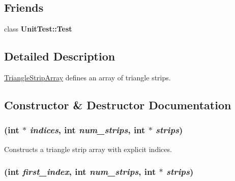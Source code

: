 \subsection*{Friends}
\begin{CompactItemize}
\item 
\hypertarget{classm3g_1_1TriangleStripArray_1f61169bea98d63b51332345ccaea9d5}{
class \textbf{UnitTest::Test}}
\label{classm3g_1_1TriangleStripArray_1f61169bea98d63b51332345ccaea9d5}

\end{CompactItemize}


\subsection{Detailed Description}
\hyperlink{classm3g_1_1TriangleStripArray}{TriangleStripArray} defines an array of triangle strips. 

\subsection{Constructor \& Destructor Documentation}
\hypertarget{classm3g_1_1TriangleStripArray_57d4e874819367084aeadb11593c4436}{
\subsubsection[{TriangleStripArray}]{ (int $\ast$ {\em indices}, \/  int {\em num\_\-strips}, \/  int $\ast$ {\em strips})}}
\label{classm3g_1_1TriangleStripArray_57d4e874819367084aeadb11593c4436}


Constructs a triangle strip array with explicit indices. \hypertarget{classm3g_1_1TriangleStripArray_d2ca9884a6ccf32da3cee977549b5ee0}{
\subsubsection[{TriangleStripArray}]{ (int {\em first\_\-index}, \/  int {\em num\_\-strips}, \/  int $\ast$ {\em strips})}}
\label{classm3g_1_1TriangleStripArray_d2ca9884a6ccf32da3cee977549b5ee0}


